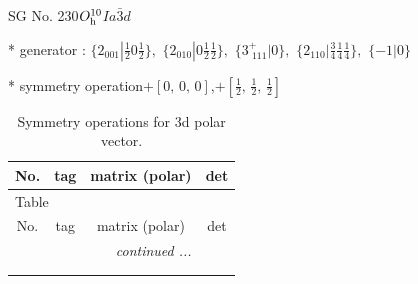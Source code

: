 \documentclass[fleqn,8pt]{jsarticle}
\begin{document}
\setcounter{MaxMatrixCols}{32}

\renewcommand{\tablename}{Table~}
\renewcommand{\figurename}{Figure~}
\begin{center}
\LARGE
SG No. 230\quad$O_{\rm h}^{10}$\quad$Ia\bar{3}d$\quad[ cubic ]
\end{center}

* generator : $\{2{}_{001}|\frac{1}{2} 0 \frac{1}{2}\},\,\,\{2{}_{010}|0 \frac{1}{2} \frac{1}{2}\},\,\,\{3^{+}_{\,\,111}|0\},\,\,\{2{}_{110}|\frac{3}{4} \frac{1}{4} \frac{1}{4}\},\,\,\{-1|0\}$

* symmetry operation\quad$+\left[ 0,\, 0,\, 0 \right]$,\quad $+\left[ \frac{1}{2},\, \frac{1}{2},\, \frac{1}{2} \right]$
\renewcommand{\arraystretch}{1.3}
\begin{longtable}{cccc}
\caption{Symmetry operations for 3d polar vector.}
 \\
 \hline \hline
No. & tag & matrix (polar) & det \\ \hline \endfirsthead

\multicolumn{3}{l}{\tablename\ \thetable{}} \\
 \hline \hline
No. & tag & matrix (polar) & det \\ \hline \endhead

 \hline \hline
\multicolumn{3}{r}{\footnotesize\it continued ...} \\ \endfoot

 \hline \hline
\multicolumn{3}{r}{} \\ \endlastfoot


\end{longtable}
\end{document}
